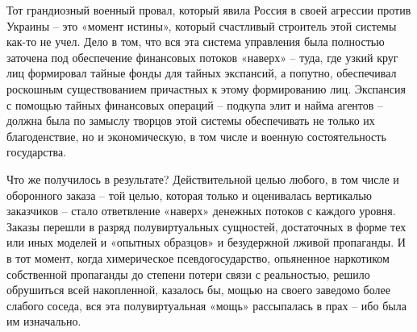 \begin{itemize}
\begin{multicols}{2}
Тот грандиозный военный провал, который явила Россия в своей агрессии против
Украины – это «момент истины», который счастливый строитель этой системы как-то
не учел. Дело в том, что вся эта система управления была полностью заточена под
обеспечение финансовых потоков «наверх» – туда, где узкий круг лиц формировал
тайные фонды для тайных экспансий, а попутно, обеспечивал роскошным
существованием причастных к этому формированию лиц. Экспансия с помощью тайных
финансовых операций – подкупа элит и найма агентов – должна была по замыслу
творцов этой системы обеспечивать не только их благоденствие, но и
экономическую, в том числе и военную состоятельность государства.

Что же получилось в результате? Действительной целью любого, в том числе и
оборонного заказа – той целью, которая только и оценивалась вертикалью
заказчиков – стало ответвление «наверх» денежных потоков с каждого уровня.
Заказы перешли в разряд полувиртуальных сущностей, достаточных в форме тех или
иных моделей и «опытных образцов» и безудержной лживой пропаганды. И в тот
момент, когда химерическое псевдогосударство, опьяненное наркотиком собственной
пропаганды до степени потери связи с реальностью, решило обрушиться всей
накопленной, казалось бы, мощью на своего заведомо более слабого соседа, вся
эта полувиртуальная «мощь» рассыпалась в прах – ибо была им изначально.

\end{multicols} %

\end{itemize} %
